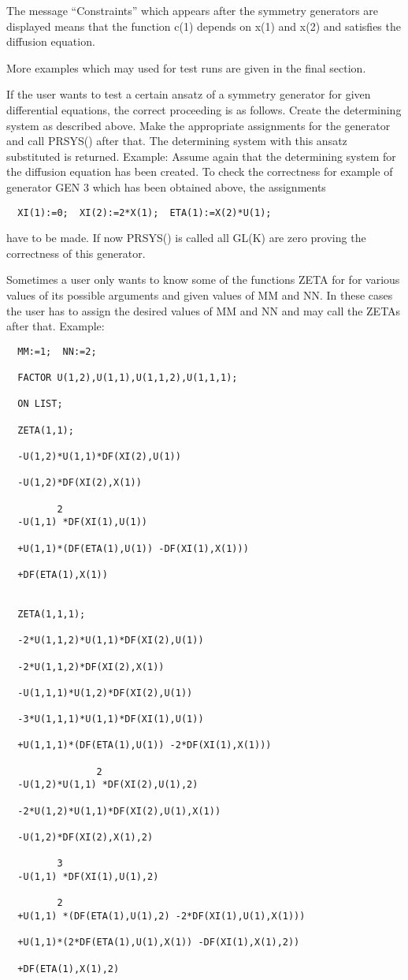 The message ``Constraints'' which appears after the symmetry generators
are displayed means that the function c(1) depends on x(1) and x(2)
and satisfies the diffusion equation.

More examples which may used for test runs are given in the final
section.

If the user wants to test a certain ansatz of a symmetry generator for
given differential equations, the correct proceeding is as follows.
Create the determining system as described above. Make the appropriate
assignments for the generator and call PRSYS() after that.  The
determining system with this ansatz substituted is returned.  Example:
Assume again that the determining system for the diffusion equation
has been created. To check the correctness for example of generator GEN
3 which has been obtained above, the assignments

\begin{verbatim}
  XI(1):=0;  XI(2):=2*X(1);  ETA(1):=X(2)*U(1);
\end{verbatim}

have to be made. If now PRSYS() is called all GL(K) are zero
proving the correctness of this generator.

Sometimes a user only wants to know some of the functions ZETA for for
various values of its possible arguments and given values of MM and
NN. In these cases the user has to assign the desired values of MM and
NN and may call the ZETAs after that. Example:

\begin{verbatim}
  MM:=1;  NN:=2;

  FACTOR U(1,2),U(1,1),U(1,1,2),U(1,1,1);

  ON LIST;

  ZETA(1,1);

  -U(1,2)*U(1,1)*DF(XI(2),U(1))

  -U(1,2)*DF(XI(2),X(1))

         2
  -U(1,1) *DF(XI(1),U(1))

  +U(1,1)*(DF(ETA(1),U(1)) -DF(XI(1),X(1)))

  +DF(ETA(1),X(1))


  ZETA(1,1,1);

  -2*U(1,1,2)*U(1,1)*DF(XI(2),U(1))

  -2*U(1,1,2)*DF(XI(2),X(1))

  -U(1,1,1)*U(1,2)*DF(XI(2),U(1))

  -3*U(1,1,1)*U(1,1)*DF(XI(1),U(1))

  +U(1,1,1)*(DF(ETA(1),U(1)) -2*DF(XI(1),X(1)))

                2
  -U(1,2)*U(1,1) *DF(XI(2),U(1),2)

  -2*U(1,2)*U(1,1)*DF(XI(2),U(1),X(1))

  -U(1,2)*DF(XI(2),X(1),2)

         3
  -U(1,1) *DF(XI(1),U(1),2)

         2
  +U(1,1) *(DF(ETA(1),U(1),2) -2*DF(XI(1),U(1),X(1)))

  +U(1,1)*(2*DF(ETA(1),U(1),X(1)) -DF(XI(1),X(1),2))

  +DF(ETA(1),X(1),2)
\end{verbatim}

